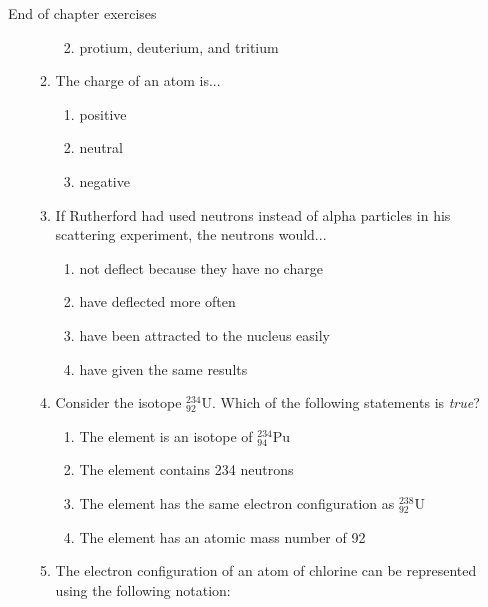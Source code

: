 \begin{eocexercises}{ End of chapter exercises}
\begin{enumerate}[noitemsep, label=\textbf{\arabic*}. ]
\begin{enumerate}[noitemsep, label=\textbf{\alph*}. ]
\begin{enumerate}[noitemsep, label=\textbf{\alph*}. ]
\label{m38741*uid202}\item protium, deuterium, and tritium
\end{enumerate}
                \label{m38741*uid203}\item The charge of an atom is...
\label{m38741*id263355}\begin{enumerate}[noitemsep, label=\textbf{\alph*}. ] 
            \label{m38741*uid204}\item positive
\label{m38741*uid205}\item neutral
\label{m38741*uid206}\item negative
\end{enumerate}
                \label{m38741*uid207}\item If Rutherford had used neutrons instead of alpha particles in his scattering experiment, the neutrons would...
\label{m38741*id263410}\begin{enumerate}[noitemsep, label=\textbf{\alph*}. ] 
            \label{m38741*uid208}\item not deflect because they have no charge
\label{m38741*uid209}\item have deflected more often
\label{m38741*uid210}\item have been attracted to the nucleus easily
\label{m38741*uid211}\item have given the same results
\end{enumerate}
                \label{m38741*uid212}\item Consider the isotope $_{92}^{234}\mathrm{U}$. Which of the following statements is \textsl{true}?
\label{m38741*id263500}\begin{enumerate}[noitemsep, label=\textbf{\alph*}. ] 
            \label{m38741*uid213}\item The element is an isotope of $_{94}^{234}\mathrm{Pu}$
\label{m38741*uid214}\item The element contains 234 neutrons
\label{m38741*uid215}\item The element has the same electron configuration as $_{92}^{238}\mathrm{U}$
\label{m38741*uid216}\item The element has an atomic mass number of 92
\end{enumerate}
                \label{m38741*uid217}\item The electron configuration of an atom of chlorine can be represented using the following notation:
\label{m38741*id263598}\begin{enumerate}[noitemsep, label=\textbf{\alph*}. ] 

\end{enumerate}
\end{enumerate}
\end{enumerate}
\end{eocexercises}
